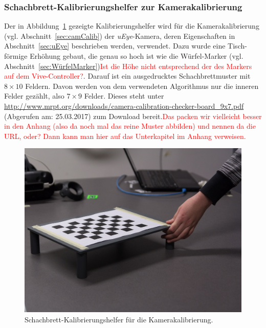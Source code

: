 \subsubsection{Schachbrett-Kalibrierungshelfer zur Kamerakalibrierung}\label{sec:SchachbrettKalib} 
Der in Abbildung~\ref{fig:schachbrettKalib} gezeigte Kalibrierungshelfer wird für die Kamerakalibrierung (vgl. Abschnitt~\ref{sec:camCalib}) der \textit{uEye}-Kamera, deren Eigenschaften in Abschnitt~\ref{sec:uEye} beschrieben werden, verwendet. Dazu wurde eine Tisch-förmige Erhöhung gebaut, die genau so hoch ist wie die Würfel-Marker (vgl. Abschnitt~\ref{sec:WürfelMarker})\textcolor{red}{Ist die Höhe nicht entsprechend der des Markers auf dem Vive-Controller?}. Darauf ist ein ausgedrucktes Schachbrettmuster mit $8\times10$ Feldern. Davon werden von dem verwendeten Algorithmus nur die inneren Felder gezählt, also $7\times9$ Felder. Dieses steht unter \url{http://www.mrpt.org/downloads/camera-calibration-checker-board_9x7.pdf} (Abgerufen am: 25.03.2017) zum Download bereit.\textcolor{red}{Das packen wir vielleicht besser in den Anhang (also da noch mal das reine Muster abbilden) und nennen da die URL, oder? Dann kann man hier auf das Unterkapitel im Anhang verweisen.}

	\begin{figure}[H] 
	\center 
	\includegraphics[trim = 0mm 20mm 30mm 40mm, clip]{Bilder/Eigene Fotos/IMG_0004.jpg}			
	\caption{Schachbrett-Kalibrierungshelfer für die Kamerakalibrierung.}
	\label{fig:schachbrettKalib}
\end{figure}

